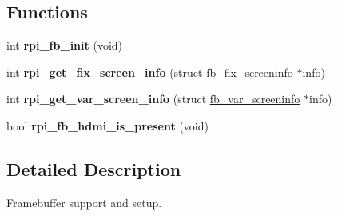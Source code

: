 \subsection*{Functions}
\begin{DoxyCompactItemize}
\item 
\mbox{\label{group__raspberrypi__fb_gad6a7ef1b06036fd55945077b6e25bb2d}} 
int {\bfseries rpi\+\_\+fb\+\_\+init} (void)
\item 
\mbox{\label{group__raspberrypi__fb_ga4667e6b7f279f2f3161edc0db0ea9b59}} 
int {\bfseries rpi\+\_\+get\+\_\+fix\+\_\+screen\+\_\+info} (struct \mbox{\hyperlink{structfb__fix__screeninfo}{fb\+\_\+fix\+\_\+screeninfo}} $\ast$info)
\item 
\mbox{\label{group__raspberrypi__fb_gad36995bc476f9ddcf6f9e656dab3e267}} 
int {\bfseries rpi\+\_\+get\+\_\+var\+\_\+screen\+\_\+info} (struct \mbox{\hyperlink{structfb__var__screeninfo}{fb\+\_\+var\+\_\+screeninfo}} $\ast$info)
\item 
\mbox{\label{group__raspberrypi__fb_ga81cd59c995b935fbb3afc6775043b8c5}} 
bool {\bfseries rpi\+\_\+fb\+\_\+hdmi\+\_\+is\+\_\+present} (void)
\end{DoxyCompactItemize}


\subsection{Detailed Description}
Framebuffer support and setup. 

